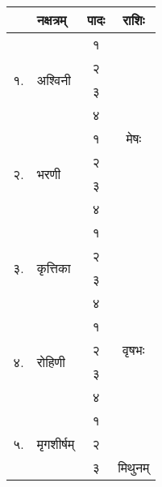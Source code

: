 \begingroup
\small\renewcommand{\arraystretch}{0.333}
\begin{longtable}{|l@{~}l|>{\tiny}c|c|}
  \hline
  & नक्षत्रम्                   & \small{पादः} & राशिः                  \\\hline
  \endhead
  \multirow{4}{*}{ १.}            & \multirow{4}{*}{अश्विनी}  & १            & \multirow{9}{*}{मेषः}   \\*
  &                          & २            &                        \\*
  &                          & ३            &                        \\*
  &                          & ४            &                        \\*
  \cline{1-3}\multirow{4}{*}{ २.} & \multirow{4}{*}{भरणी}    & १            &                        \\*
  &                          & २            &                        \\*
  &                          & ३            &                        \\*
  &                          & ४            &                        \\*
  \cline{1-3}\multirow{4}{*}{ ३.} & \multirow{4}{*}{कृत्तिका}  & १            &                        \\*
  \cline{3-4}                     &                          & २            & \multirow{9}{*}{वृषभः}  \\*
  &                          & ३            &                        \\*
  &                          & ४            &                        \\*
  \cline{1-3}\multirow{4}{*}{ ४.} & \multirow{4}{*}{रोहिणी}  & १            &                        \\*
  &                          & २            &                        \\*
  &                          & ३            &                        \\*
  &                          & ४            &                        \\*
  \cline{1-3}\multirow{4}{*}{ ५.} & \multirow{4}{*}{मृगशीर्षम्} & १            &                        \\*
  &                          & २            &                        \\*
  \cline{3-4}                     &                          & ३            & \multirow{9}{*}{मिथुनम्} \\*

\end{longtable}
